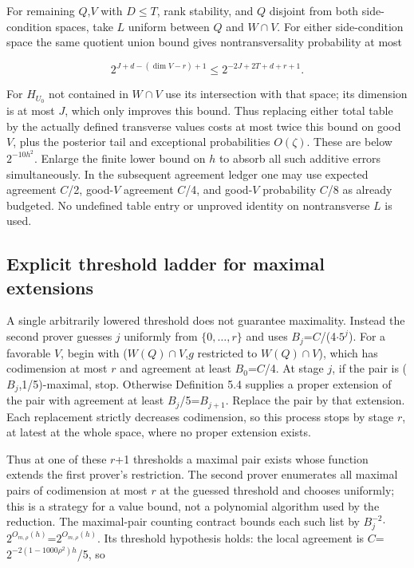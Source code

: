 For remaining \(Q\),\(V\) with \(D\)\(\le\)\(T\), rank stability, and \(Q\) disjoint from both side-condition spaces, take \(L\) uniform between \(Q\) and \(W\cap V\). For either side-condition space the same quotient union bound gives nontransversality probability at most

\begin{equation}\label{eq:17}
2^{J+d-(\dim V-r)+1}\le2^{-2J+2T+d+r+1}.
\end{equation}

For \(H_{U_0}\) not contained in \(W\cap V\) use its intersection with that space; its dimension is at most \(J\), which only improves this bound. Thus replacing either total table by the actually defined transverse values costs at most twice this bound on good \(V\), plus the posterior tail and exceptional probabilities \(O(\zeta)\). These are below \(2^{-10h^2}\). Enlarge the finite lower bound on \(h\) to absorb all such additive errors simultaneously. In the subsequent agreement ledger one may use expected agreement \(C\)/2, good-\(V\) agreement \(C\)/4, and good-\(V\) probability \(C\)/8 as already budgeted. No undefined table entry or unproved identity on nontransverse \(L\) is used.

\subsection{Explicit threshold ladder for maximal extensions}
A single arbitrarily lowered threshold does not guarantee maximality. Instead the second prover guesses \(j\) uniformly from \(\{0,\ldots,r\}\) and uses \(B_j\)=\(C\)/(4\(\cdot\)\(5^j\)). For a favorable \(V\), begin with (\(W(Q)\cap V\),\(g\) restricted to \(W(Q)\cap V\)), which has codimension at most \(r\) and agreement at least \(B_0\)=\(C\)/4. At stage \(j\), if the pair is (\(B_j\),1/5)-maximal, stop. Otherwise Definition 5.4 supplies a proper extension of the pair with agreement at least \(B_j\)/5=\(B_{j+1}\). Replace the pair by that extension. Each replacement strictly decreases codimension, so this process stops by stage \(r\), at latest at the whole space, where no proper extension exists.

Thus at one of these \(r\)+1 thresholds a maximal pair exists whose function extends the first prover's restriction. The second prover enumerates all maximal pairs of codimension at most \(r\) at the guessed threshold and chooses uniformly; this is a strategy for a value bound, not a polynomial algorithm used by the reduction. The maximal-pair counting contract bounds each such list by \(B_j^{-2}\)\(\cdot\)\(2^{O_{m,\rho}(h)}\)=\(2^{O_{m,\rho}(h)}\). Its threshold hypothesis holds: the local agreement is \(C\)=\(2^{-2(1-1000\rho^2)h}\)/5, so

